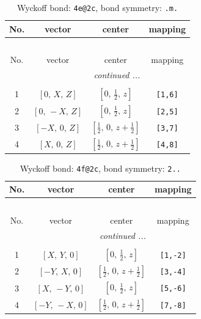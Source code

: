 \documentclass[fleqn,8pt]{jsarticle}
\begin{document}
\renewcommand{\arraystretch}{1.2}
\begin{longtable}{cccc}
\caption{Wyckoff bond: {\tt 4e@2c}, bond symmetry: {\tt .m.}}
 \\
 \hline \hline
No. & vector & center & mapping \\ \hline \endfirsthead

\multicolumn{3}{l}{\tablename\ \thetable{}} \\
 \hline \hline
No. & vector & center & mapping \\ \hline \endhead

 \hline \hline
\multicolumn{3}{r}{\footnotesize\it continued ...} \\ \endfoot

 \hline \hline
\multicolumn{3}{r}{} \\ \endlastfoot

1 & $\left[ 0,\, X,\, Z \right]$ & $\left[ 0,\, \frac{1}{2},\, z \right]$ & {\tt [1,6]} \\ \hline
2 & $\left[ 0,\, - X,\, Z \right]$ & $\left[ 0,\, \frac{1}{2},\, z \right]$ & {\tt [2,5]} \\ \hline
3 & $\left[ - X,\, 0,\, Z \right]$ & $\left[ \frac{1}{2},\, 0,\, z + \frac{1}{2} \right]$ & {\tt [3,7]} \\ \hline
4 & $\left[ X,\, 0,\, Z \right]$ & $\left[ \frac{1}{2},\, 0,\, z + \frac{1}{2} \right]$ & {\tt [4,8]} \\
\end{longtable}
\renewcommand{\arraystretch}{1.2}
\begin{longtable}{cccc}
\caption{Wyckoff bond: {\tt 4f@2c}, bond symmetry: {\tt 2..}}
 \\
 \hline \hline
No. & vector & center & mapping \\ \hline \endfirsthead

\multicolumn{3}{l}{\tablename\ \thetable{}} \\
 \hline \hline
No. & vector & center & mapping \\ \hline \endhead

 \hline \hline
\multicolumn{3}{r}{\footnotesize\it continued ...} \\ \endfoot

 \hline \hline
\multicolumn{3}{r}{} \\ \endlastfoot

1 & $\left[ X,\, Y,\, 0 \right]$ & $\left[ 0,\, \frac{1}{2},\, z \right]$ & {\tt [1,-2]} \\ \hline
2 & $\left[ - Y,\, X,\, 0 \right]$ & $\left[ \frac{1}{2},\, 0,\, z + \frac{1}{2} \right]$ & {\tt [3,-4]} \\ \hline
3 & $\left[ X,\, - Y,\, 0 \right]$ & $\left[ 0,\, \frac{1}{2},\, z \right]$ & {\tt [5,-6]} \\ \hline
4 & $\left[ - Y,\, - X,\, 0 \right]$ & $\left[ \frac{1}{2},\, 0,\, z + \frac{1}{2} \right]$ & {\tt [7,-8]} \\
\end{longtable}
\end{document}
